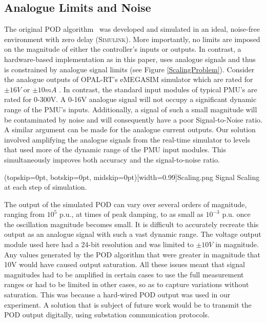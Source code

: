 \documentclass{ieeeaccess}
\begin{document}
\subsection{Analogue Limits and Noise}
The original POD algorithm~\cite{PhasorPOD} was developed and simulated in an ideal, noise-free environment with zero delay (\textsc{Simulink}). More importantly, no limits are imposed on the magnitude of either the controller's inputs or outputs. In contrast, a hardware-based implementation as in this paper, uses analogue signals and thus is constrained by analogue signal limits (see Figure \ref{ScalingProblem}). Consider the analogue outputs of OPAL-RT's eMEGASIM simulator which are rated for $\pm16V$ or $\pm10mA$  \cite{eMEGASIM}. In contrast, the standard input modules of typical PMU's are rated for 0-300V. A 0-16V analogue signal will not occupy a significant dynamic range of the PMU\rq{}s inputs. Additionally, a signal of such a small magnitude will be contaminated by noise and will consequently have a poor Signal-to-Noise ratio. A similar argument can be made for the analogue current outputs. Our solution involved amplifying the analogue signals from the real-time simulator to levels that used more of the dynamic range of the PMU input modules. This simultaneously improves both accuracy and the signal-to-noise ratio.

\Figure[tbp!](topskip=0pt, botskip=0pt, midskip=0pt)[width=0.99\columnwidth]{Scaling.png}
{Signal Scaling at each step of simulation.\label{ScalingProblem}}

The output of the simulated POD can vary over several orders of magnitude, ranging from $10^{5}$ p.u., at times of peak damping, to as small as $10^{-3}$ p.u. once the oscillation magnitude  becomes small. It is difficult to accurately recreate this output as an analogue signal with such a vast dynamic range. The voltage output module used here had a 24-bit resolution and was limited to $\pm 10V$ in magnitude. Any values generated by the POD algorithm that were greater in magnitude that 10V would have caused output saturation. All these issues meant that signal magnitudes had to be amplified in certain cases to use the full measurement ranges or had to be limited in other cases, so as to capture variations without saturation. This was because a hard-wired POD output was used in our experiment. A solution that is subject of future work  would be to transmit the POD output digitally, using substation communication protocols.
\end{document}
